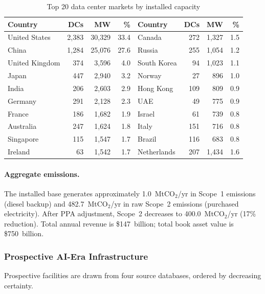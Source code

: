 \begin{table}[H]
\centering
\small
\caption{Top 20 data center markets by installed capacity}
\label{tab:app_country_coverage}
\begin{tabular}{@{}lrrr|lrrr@{}}
\toprule
\textbf{Country} & \textbf{DCs} & \textbf{MW} & \textbf{\%} & \textbf{Country} & \textbf{DCs} & \textbf{MW} & \textbf{\%} \\
\midrule
United States & 2{,}383 & 30{,}329 & 33.4 & Canada & 272 & 1{,}327 & 1.5 \\
China & 1{,}284 & 25{,}076 & 27.6 & Russia & 255 & 1{,}054 & 1.2 \\
United Kingdom & 374 & 3{,}596 & 4.0 & South Korea & 94 & 1{,}023 & 1.1 \\
Japan & 447 & 2{,}940 & 3.2 & Norway & 27 & 896 & 1.0 \\
India & 206 & 2{,}603 & 2.9 & Hong Kong & 109 & 809 & 0.9 \\
Germany & 291 & 2{,}128 & 2.3 & UAE & 49 & 775 & 0.9 \\
France & 186 & 1{,}682 & 1.9 & Israel & 61 & 739 & 0.8 \\
Australia & 247 & 1{,}624 & 1.8 & Italy & 151 & 716 & 0.8 \\
Singapore & 115 & 1{,}547 & 1.7 & Brazil & 116 & 683 & 0.8 \\
Ireland & 63 & 1{,}542 & 1.7 & Netherlands & 207 & 1{,}434 & 1.6 \\
\bottomrule
\end{tabular}
\end{table}

\paragraph{Aggregate emissions.} The installed base generates approximately 1.0~MtCO$_2$/yr
in Scope~1 emissions (diesel backup) and 482.7~MtCO$_2$/yr in raw Scope~2 emissions
(purchased electricity). After PPA adjustment, Scope~2 decreases to 400.0~MtCO$_2$/yr
(17\% reduction). Total annual revenue is \$147~billion; total book asset value is
\$750~billion.


\subsubsection{Prospective AI-Era Infrastructure}

Prospective facilities are drawn from four source databases, ordered by decreasing certainty.

